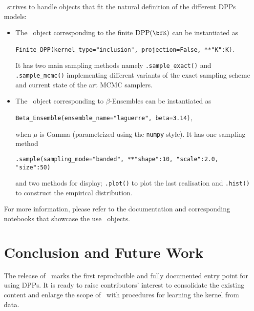 \documentclass[twoside,11pt]{article}
\begin{document}
  \DPPy\ strives to handle objects that fit the natural definition of the different DPPs models:
  \begin{itemize}
	  \item The \DPPy\ object corresponding to the finite $\DPP(\bfK)$ can be instantiated as
	  \begin{nscenter}
	  	\texttt{Finite_DPP(kernel_type="inclusion", projection=False, **{"K":K})}.
	  \end{nscenter}
		It has two main sampling methods namely \texttt{.sample_exact()} and \texttt{.sample_mcmc()} implementing different variants of the exact sampling scheme and current state of the art MCMC samplers.
		
		\item The \DPPy\ object corresponding to $\beta$-Ensembles can be instantiated as
		\begin{nscenter}
			\texttt{Beta_Ensemble(ensemble_name="laguerre", beta=3.14)},
		\end{nscenter}
		when $\mu$ is Gamma (parametrized using the \texttt{numpy} style).
		It has one sampling method 
		\begin{nscenter}
			\texttt{.sample(sampling_mode="banded", **{"shape":10, "scale":2.0, "size":50})} 
		\end{nscenter}
		and two methods for display; \texttt{.plot()} to plot the last realisation and \texttt{.hist()} to construct the empirical distribution.

  \end{itemize}
  
  For more information, please refer to the documentation and corresponding notebooks that showcase the use \DPPy\ objects.
  



\section{Conclusion and Future Work} %
\label{sec:conclusion_and_future_work}

The release of \DPPy\ marks the first reproducible and fully documented entry point for using DPPs. It is ready to raise contributors' interest to consolidate the existing content and enlarge the scope of \DPPy\ \eg with procedures for learning the kernel from data.

\end{document}
